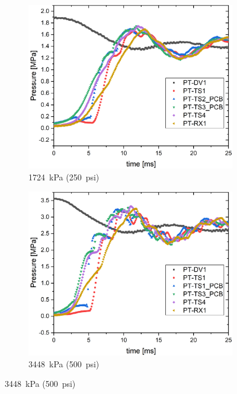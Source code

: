 \begin{figure}[htbp]
    \vspace{16pt}
    \centering
    \begin{subfigure}{0.49\textwidth}
        \centering
        \includegraphics[width=\textwidth]{results/plots/270psi_MPa_25.png}
        \caption{\SI{1724}{\kilo\pascal} (\SI{250}{psi})}
        \label{fig:piston multi 250}
    \end{subfigure}
    \hfill
    \begin{subfigure}{0.49\textwidth}
        \centering
        \includegraphics[width=\textwidth]{results/plots/500psi_Mpa_25.png}
        \caption{\SI{3448}{\kilo\pascal} (\SI{500}{psi})}
        \label{fig:piston multi 500}
    \end{subfigure}
    

\end{figure}
